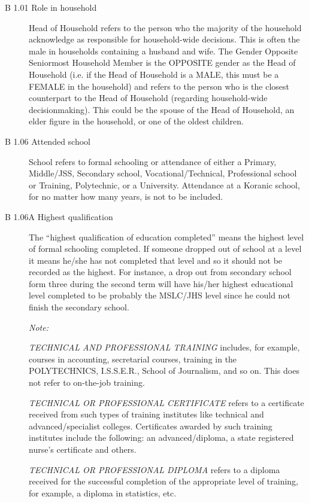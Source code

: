 \documentclass[a4paper]{refart}
\begin{document}
\begin{description}
\item[B 1.01 Role in household] Head of Household refers to the person who the majority of the household acknowledge as responsible for household-wide decisions. This is often the male in households containing a husband and wife. The Gender Opposite Seniormost Household Member is the OPPOSITE gender as the Head of Household (i.e. if the Head of Household is a MALE, this must be a FEMALE in the household) and refers to the person who is the closest counterpart to the Head of Household (regarding household-wide decisionmaking). This could be the spouse of the Head of Household, an elder figure in the household, or one of the oldest children.

\item[B 1.06 Attended school] School refers to formal schooling or attendance of either a Primary, Middle/JSS, Secondary school, Vocational/Technical, Professional school or Training, Polytechnic, or a University. Attendance at a Koranic school, for no matter how many years, is not to be included.

\item[B 1.06A Highest qualification] The ``highest qualification of education completed'' means the highest level of formal schooling completed. If someone dropped out of school at a level it means he/she has not completed that level and so it should not be recorded as the highest. For instance, a drop out from secondary school form three during the second term will have his/her highest educational level completed to be probably the MSLC/JHS level since he could not finish the secondary school.

\textit{Note:}

\textit{TECHNICAL AND PROFESSIONAL TRAINING} includes, for example, courses in accounting, secretarial courses, training in the POLYTECHNICS, I.S.S.E.R., School of Journalism, and so on. This does not refer to on-the-job training.

\textit{TECHNICAL OR PROFESSIONAL CERTIFICATE} refers to a certificate received from such types of training institutes like technical and advanced/specialist colleges. Certificates awarded by such training institutes include the following: an advanced/diploma, a state registered nurse's certificate and others.

\textit{TECHNICAL OR PROFESSIONAL DIPLOMA} refers to a diploma received for the successful completion of the appropriate level of training, for example, a diploma in statistics, etc.

\end{description}
\end{document}
